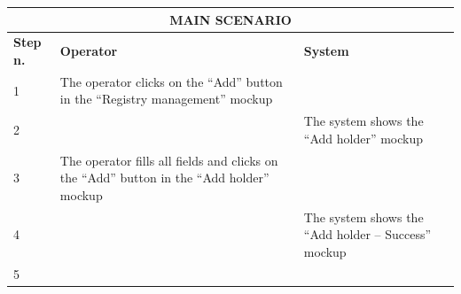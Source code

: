 {{{			\begin{table}[h]
			\begin{tabular}{|p{2cm}|p{6cm}|p{6cm}|}
			\hline
				\multicolumn{3}{|c|}{MAIN SCENARIO}\\
			\hline
				\centering \vspace{1mm} \bfseries{Step n.} \vspace{1mm} & \vspace{1mm} \bfseries{Operator} \vspace{1mm} & 
				\vspace{1mm} \bfseries{System} \vspace{1mm}\\
			\hline
				\vspace{1mm} 1 \vspace{1mm} &
				\vspace{1mm} The operator clicks on the “Add” button in the “Registry management” mockup \vspace{1mm} & 
				\vspace{1mm} \vspace{1mm} \\
			\hline
				\vspace{1mm} 2 \vspace{1mm} &
				\vspace{1mm} \vspace{1mm} & 
				\vspace{1mm} The system shows the “Add holder” mockup \vspace{1mm} \\
			\hline
				\vspace{1mm} 3 \vspace{1mm} &
				\vspace{1mm} The operator fills all fields and clicks on the “Add” button in the “Add holder” mockup \vspace{1mm} & 
				\vspace{1mm} \vspace{1mm} \\
			\hline
				\vspace{1mm} 4 \vspace{1mm} &
				\vspace{1mm} \vspace{1mm} & 
				\vspace{1mm} The system shows the “Add holder – Success”  mockup \vspace{1mm} \\
			\hline
				\vspace{1mm} 5 \vspace{1mm} &

\end{tabular}
\end{table}}}}
